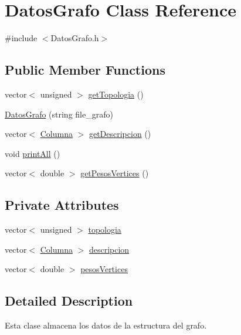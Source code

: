 \hypertarget{classDatosGrafo}{\section{Datos\-Grafo Class Reference}
\label{classDatosGrafo}
}


{\ttfamily \#include $<$Datos\-Grafo.\-h$>$}

\subsection*{Public Member Functions}
\begin{DoxyCompactItemize}
\item 
vector$<$ unsigned $>$ \hyperlink{classDatosGrafo_a6756a89c3cd9a4ee55325b1db9936fa1}{get\-Topologia} ()
\item 
\hyperlink{classDatosGrafo_a2e74f7e8b29759148dc6dc19472f7040}{Datos\-Grafo} (string file\-\_\-grafo)
\item 
vector$<$ \hyperlink{Columna_8h_ab9591322692e52302d24161e6e115994}{Columna} $>$ \hyperlink{classDatosGrafo_a8ec119ef64e4011c77052c19c5a16652}{get\-Descripcion} ()
\item 
void \hyperlink{classDatosGrafo_ab3c56e3dcb30286e561018114687e735}{print\-All} ()
\item 
vector$<$ double $>$ \hyperlink{classDatosGrafo_ae4bc073ef1368eef726d74575f10de25}{get\-Pesos\-Vertices} ()
\end{DoxyCompactItemize}
\subsection*{Private Attributes}
\begin{DoxyCompactItemize}
\item 
vector$<$ unsigned $>$ \hyperlink{classDatosGrafo_a059a327bc0f4a29c5125b8159f304d65}{topologia}
\item 
vector$<$ \hyperlink{Columna_8h_ab9591322692e52302d24161e6e115994}{Columna} $>$ \hyperlink{classDatosGrafo_a284e7d2cc2af70e04102c82a0d1406be}{descripcion}
\item 
vector$<$ double $>$ \hyperlink{classDatosGrafo_ac89ee01ba2e05ec2b9d6c219eb309631}{pesos\-Vertices}
\end{DoxyCompactItemize}


\subsection{Detailed Description}
Esta clase almacena los datos de la estructura del grafo. 

